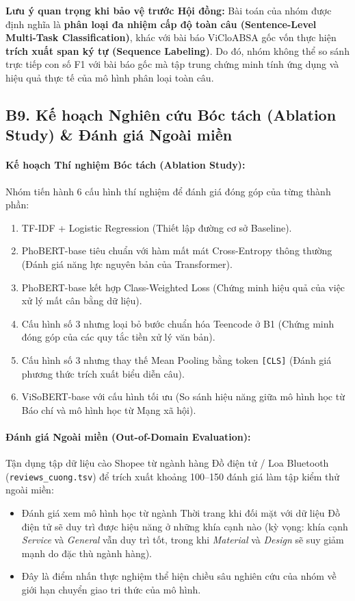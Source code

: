 \documentclass[11pt,a4paper]{article}
\begin{document}
\noindent\textbf{Lưu ý quan trọng khi bảo vệ trước Hội đồng:} Bài toán của nhóm được định nghĩa là \textbf{phân loại đa nhiệm cấp độ toàn câu (Sentence-Level Multi-Task Classification)}, khác với bài báo ViCloABSA gốc vốn thực hiện \textbf{trích xuất span ký tự (Sequence Labeling)}. Do đó, nhóm không thể so sánh trực tiếp con số F1 với bài báo gốc mà tập trung chứng minh tính ứng dụng và hiệu quả thực tế của mô hình phân loại toàn câu.

\subsection*{B9. Kế hoạch Nghiên cứu Bóc tách (Ablation Study) \& Đánh giá Ngoài miền}

\paragraph{Kế hoạch Thí nghiệm Bóc tách (Ablation Study):}
Nhóm tiến hành 6 cấu hình thí nghiệm để đánh giá đóng góp của từng thành phần:
\begin{enumerate}
    \item TF-IDF + Logistic Regression (Thiết lập đường cơ sở Baseline).
    \item PhoBERT-base tiêu chuẩn với hàm mất mát Cross-Entropy thông thường (Đánh giá năng lực nguyên bản của Transformer).
    \item PhoBERT-base kết hợp Class-Weighted Loss (Chứng minh hiệu quả của việc xử lý mất cân bằng dữ liệu).
    \item Cấu hình số 3 nhưng loại bỏ bước chuẩn hóa Teencode ở B1 (Chứng minh đóng góp của các quy tắc tiền xử lý văn bản).
    \item Cấu hình số 3 nhưng thay thế Mean Pooling bằng token \texttt{[CLS]} (Đánh giá phương thức trích xuất biểu diễn câu).
    \item ViSoBERT-base với cấu hình tối ưu (So sánh hiệu năng giữa mô hình học từ Báo chí và mô hình học từ Mạng xã hội).
\end{enumerate}

\paragraph{Đánh giá Ngoài miền (Out-of-Domain Evaluation):}
Tận dụng tập dữ liệu cào Shopee từ ngành hàng Đồ điện tử / Loa Bluetooth (\texttt{reviews\_cuong.tsv}) để trích xuất khoảng 100--150 đánh giá làm tập kiểm thử ngoài miền:
\begin{itemize}
    \item Đánh giá xem mô hình học từ ngành Thời trang khi đối mặt với dữ liệu Đồ điện tử sẽ duy trì được hiệu năng ở những khía cạnh nào (kỳ vọng: khía cạnh \textit{Service} và \textit{General} vẫn duy trì tốt, trong khi \textit{Material} và \textit{Design} sẽ suy giảm mạnh do đặc thù ngành hàng).
    \item Đây là điểm nhấn thực nghiệm thể hiện chiều sâu nghiên cứu của nhóm về giới hạn chuyển giao tri thức của mô hình.
\end{itemize}
\end{document}
